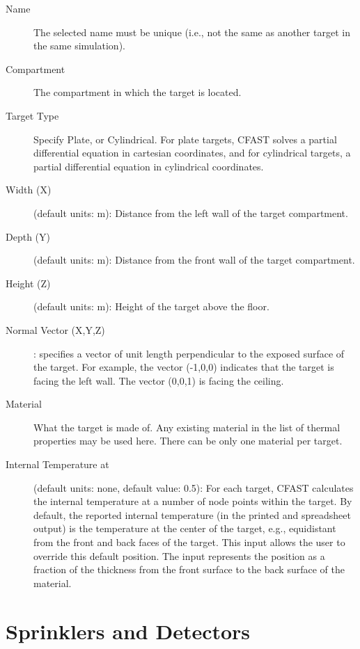 \begin{description}
\item[Name] The selected name must be unique (i.e., not the same as another target in the same simulation).
\item[Compartment] The compartment in which the target is located.
\item[Target Type] Specify Plate, or Cylindrical.  For plate targets, CFAST solves a partial differential equation in cartesian coordinates, and for cylindrical targets, a partial differential equation in cylindrical coordinates.
\item[Width (X)] (default units: m): Distance from the left wall of the target compartment.
\item[Depth (Y)] (default units: m): Distance from the front wall of the target compartment.
\item[Height (Z)] (default units: m): Height of the target above the floor.
\item[Normal Vector (X,Y,Z)]: specifies a vector of unit length perpendicular to the exposed surface of the target. For example, the vector (-1,0,0) indicates that the target is facing the left wall. The vector (0,0,1) is facing the ceiling.
\item[Material] What the target is made of. Any existing material in the list of thermal properties may be used here. There can be only one material per target.
\item[Internal Temperature at] (default units: none, default value: 0.5): For each target, CFAST calculates the internal temperature at a number of node points within the target. By default, the reported internal temperature (in the printed and spreadsheet output) is the temperature at the center of the target, e.g., equidistant from the front and back faces of the target. This input allows the user to override this default position. The input represents the position as a fraction of the thickness from the front surface to the back surface of the material.
\end{description}





\chapter{Sprinklers and Detectors}


